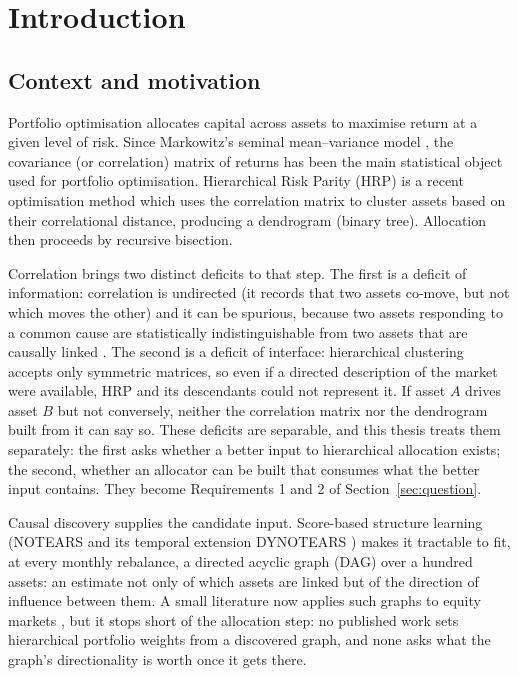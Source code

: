 \chapter{Introduction}
\label{chap:intro}

\section{Context and motivation}
\label{sec:motivation}

Portfolio optimisation allocates capital across assets to maximise return
at a given level of risk. Since Markowitz's seminal mean--variance model
\cite{markowitz1952portfolio}, the covariance (or correlation) 
matrix of returns has been the main statistical object used for 
portfolio optimisation. 
Hierarchical Risk Parity (HRP) is a recent optimisation method
\cite{lopezdeprado2016hrp} which uses the correlation matrix
to cluster assets based on their correlational distance,
producing a dendrogram (binary tree). 
Allocation then proceeds by recursive bisection.

Correlation brings two distinct deficits to that step. The first is a deficit
of information: correlation is undirected (it records that two
assets co-move, but not which moves the other) and it can be spurious,
because two assets responding to a common cause are statistically
indistinguishable from two assets that are causally linked
\cite{simon1954spurious,
lopezdeprado2023causal}. The second is a deficit of interface:
hierarchical clustering accepts only symmetric matrices, so even if a
directed description of the market were available, HRP and its descendants
could not represent it. If asset $A$ drives asset $B$ but not conversely,
neither the correlation matrix nor the dendrogram built from it can say so.
These deficits are separable, and this thesis treats them separately: the
first asks whether a better input to hierarchical allocation exists;
the second, whether an allocator can be built that consumes what the
better input contains. They become Requirements 1 and 2 of
Section~\ref{sec:question}.

Causal discovery supplies the candidate input. Score-based structure
learning (NOTEARS \cite{zheng2018notears} and its temporal extension
DYNOTEARS \cite{pamfil2020dynotears}) makes it tractable to fit, at every
monthly rebalance, a directed acyclic graph (DAG) over a hundred assets: an
estimate not only of which assets are linked but of the direction of
influence between them. A small literature now applies such graphs to equity markets
\cite{howard2025causal,tang2024trading}, but it stops short of the allocation
step: no published work sets hierarchical portfolio weights from a discovered
graph, and none asks what the graph's directionality is worth once it gets
there.


